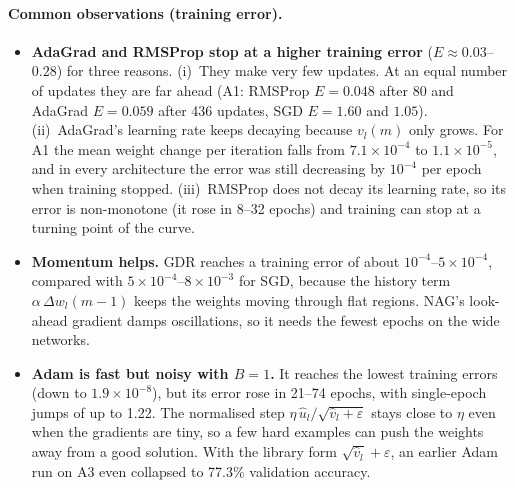 \documentclass[runningheads]{llncs}
\begin{document}
\paragraph{Common observations (training error).}
\begin{itemize}
\item \textbf{AdaGrad and RMSProp stop at a higher training error} ($E\approx0.03$--$0.28$) for three
reasons. (i)~They make very few updates. At an equal number of updates they are far ahead (A1:
RMSProp $E=0.048$ after 80 and AdaGrad $E=0.059$ after 436 updates, SGD $E=1.60$ and $1.05$). (ii)~AdaGrad's learning rate keeps decaying
because $v_l(m)$ only grows. For A1 the mean weight change per iteration falls from
$7.1\times10^{-4}$ to $1.1\times10^{-5}$, and in every architecture the error was still decreasing by
$10^{-4}$ per epoch when training stopped. (iii)~RMSProp does not decay its learning rate, so its
error is non-monotone (it rose in 8--32 epochs) and training can stop at a turning point of the
curve.
\item \textbf{Momentum helps.} GDR reaches a training error of about $10^{-4}$--$5\times10^{-4}$,
compared with $5\times10^{-4}$--$8\times10^{-3}$ for SGD, because the history term
$\alpha\,\Delta w_l(m-1)$ keeps the weights moving through flat regions. NAG's look-ahead gradient
damps oscillations, so it needs the fewest epochs on the wide networks.
\item \textbf{Adam is fast but noisy with $B=1$.} It reaches the lowest training errors (down to
$1.9\times10^{-8}$), but its error rose in 21--74 epochs, with single-epoch jumps of up to 1.22. The
normalised step $\eta\,\hat{u}_l/\sqrt{\hat{v}_l+\varepsilon}$ stays close to $\eta$ even when the
gradients are tiny, so a few hard examples can push the weights away from a good solution. With the
library form $\sqrt{\hat{v}_l}+\varepsilon$, an earlier Adam run on A3 even collapsed to 77.3\%
validation accuracy.
\end{itemize}

\end{document}
